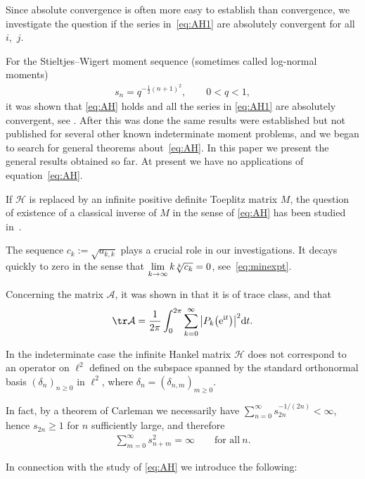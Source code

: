 Since absolute convergence is often more easy to establish than convergence, we investigate the question if the series in~\eqref{eq:AH1} are absolutely convergent for all~$i$,~$j$.

For the Stieltjes--Wigert moment sequence (sometimes called log-normal moments)
\begin{gather*}
s_n=q^{-\tfrac12 (n+1)^2},\qquad 0<q<1,
\end{gather*}
 it was shown that \eqref{eq:AH} holds and all the series in \eqref{eq:AH1} are absolutely convergent, see \cite[Section~5]{B:S1}. After this was done the same results were established but not published for several other known indeterminate moment problems, and we began to search for general theorems about~\eqref{eq:AH}. In this paper we present the general results obtained so far. At present we have no applications of equation~\eqref{eq:AH}.

If $\mathcal H$ is replaced by an infinite positive definite Toeplitz matrix $M$, the question of existence of a classical inverse of $M$ in the sense of \eqref{eq:AH} has been studied in~\cite{E:G:T}.

The sequence $c_k:=\sqrt{a_{k,k}}$ plays a crucial role in our investigations. It decays quickly to zero in the sense that $\lim\limits_{k\to\infty} k\root{k}\of{c_{k}}=0$, see~\eqref{eq:minexpt}.

Concerning the matrix $\mathcal A$, it was shown in \cite[Section~4]{B:S1} that it is of trace class, and that
\begin{gather*}
\tr\mathcal A=\frac{1}{2\pi}\int_0^{2\pi} \sum_{k=0}^\infty \big|P_k\big({\rm e}^{{\rm i}t}\big)\big|^2{\rm d}t.
\end{gather*}

In the indeterminate case the infinite Hankel matrix $\mathcal H$ does not correspond to an operator on $\ell^2$ defined on the subspace spanned by the standard orthonormal basis $(\delta_n)_{n\ge 0}$ in $\ell^2$, where $\delta_n=(\delta_{n,m})_{m\ge 0}$.

In fact, by a theorem of Carleman we necessarily have $\sum\limits_{n=0}^\infty s_{2n}^{-1/(2n)}<\infty$, hence $s_{2n}\ge 1$ for $n$ sufficiently large, and therefore
\begin{gather*}
\sum_{m=0}^\infty s_{n+m}^2=\infty\qquad \mbox{for all} \ n.
\end{gather*}

In connection with the study of \eqref{eq:AH} we introduce the following:

